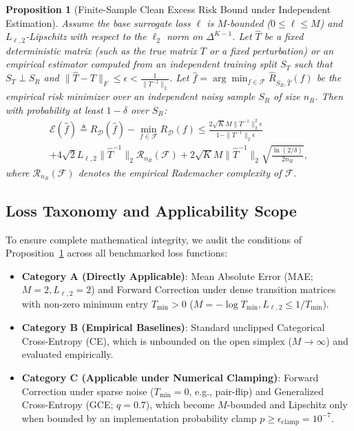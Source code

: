 \documentclass[10pt,twocolumn]{article}
\newtheorem{proposition}{Proposition}
\theoremstyle{definition}
\begin{document}
\begin{proposition}[Finite-Sample Clean Excess Risk Bound under Independent Estimation]
\label{prop:excess_risk}
Assume the base surrogate loss $\ell$ is $M$-bounded ($0 \le \ell \le M$) and $L_{\ell, 2}$-Lipschitz with respect to the $\ell_2$ norm on $\Delta^{K-1}$. Let $\hat{T}$ be a fixed deterministic matrix (such as the true matrix $T$ or a fixed perturbation) or an empirical estimator computed from an independent training split $S_T$ such that $S_T \perp S_R$ and $\|\hat{T} - T\|_F \le \epsilon < \frac{1}{\|T^{-1}\|_2}$. Let $\hat{f} = \arg\min_{f \in \mathcal{F}} \hat{R}_{S_R, \hat{T}}(f)$ be the empirical risk minimizer over an independent noisy sample $S_R$ of size $n_R$. Then with probability at least $1 - \delta$ over $S_R$:
\begin{multline}
\mathcal{E}(\hat{f}) \triangleq R_{\mathcal{D}}(\hat{f}) - \min_{f \in \mathcal{F}} R_{\mathcal{D}}(f) \le \frac{2 \sqrt{K} M \|T^{-1}\|_2^2 \epsilon}{1 - \|T^{-1}\|_2 \epsilon} \\
+ 4 \sqrt{2} L_{\ell, 2} \|\hat{T}^{-1}\|_2 \mathcal{R}_{n_R}(\mathcal{F}) + 2 \sqrt{K} M \|\hat{T}^{-1}\|_2 \sqrt{\frac{\ln(2/\delta)}{2n_R}},
\end{multline}
where $\mathcal{R}_{n_R}(\mathcal{F})$ denotes the empirical Rademacher complexity of $\mathcal{F}$.
\end{proposition}

\subsection{Loss Taxonomy and Applicability Scope}
To ensure complete mathematical integrity, we audit the conditions of Proposition~\ref{prop:excess_risk} across all benchmarked loss functions:
\begin{itemize}
    \item \textbf{Category A (Directly Applicable)}: Mean Absolute Error (MAE; $M=2, L_{\ell, 2}=2$) and Forward Correction under dense transition matrices with non-zero minimum entry $T_{\min} > 0$ ($M = -\log T_{\min}, L_{\ell, 2} \le 1/T_{\min}$).
    \item \textbf{Category B (Empirical Baselines)}: Standard unclipped Categorical Cross-Entropy (CE), which is unbounded on the open simplex ($M \to \infty$) and evaluated empirically.
    \item \textbf{Category C (Applicable under Numerical Clamping)}: Forward Correction under sparse noise ($T_{\min} = 0$, e.g., pair-flip) and Generalized Cross-Entropy (GCE; $q=0.7$), which become $M$-bounded and Lipschitz only when bounded by an implementation probability clamp $p \ge \epsilon_{\text{clamp}} = 10^{-7}$.
\end{itemize}
\end{document}
